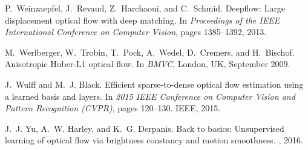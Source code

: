 \documentclass[10pt,twocolumn,letterpaper]{article}
\begin{document}
\begin{thebibliography}{10}
P.~Weinzaepfel, J.~Revaud, Z.~Harchaoui, and C.~Schmid.
\newblock Deepflow: Large displacement optical flow with deep matching.
\newblock In {\em Proceedings of the IEEE International Conference on Computer
  Vision}, pages 1385--1392, 2013.

M.~Werlberger, W.~Trobin, T.~Pock, A.~Wedel, D.~Cremers, and H.~Bischof.
\newblock Anisotropic {Huber-L1} optical flow.
\newblock In {\em BMVC}, London, UK, September 2009.

J.~Wulff and M.~J. Black.
\newblock Efficient sparse-to-dense optical flow estimation using a learned
  basis and layers.
\newblock In {\em 2015 IEEE Conference on Computer Vision and Pattern
  Recognition (CVPR)}, pages 120--130. IEEE, 2015.

J.~J. Yu, A.~W. Harley, and K.~G. Derpanis.
\newblock Back to basics: Unsupervised learning of optical flow via brightness
  constancy and motion smoothness.
, 2016.

\end{thebibliography}
\end{document}
